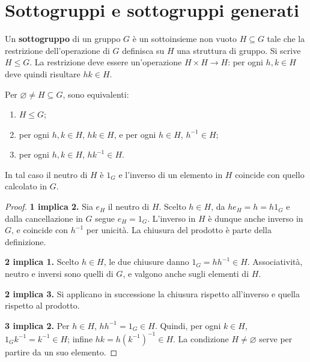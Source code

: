 \section{Sottogruppi e sottogruppi generati}
\begin{definizione}
Un \textbf{sottogruppo} di un gruppo $G$ è un sottoinsieme non vuoto $H\subseteq G$ tale che la restrizione dell'operazione di $G$ definisca su $H$ una struttura di gruppo. Si scrive $H\le G$. La restrizione deve essere un'operazione $H\times H\to H$: per ogni $h,k\in H$ deve quindi risultare $hk\in H$.
\end{definizione}

\begin{proposizione}\label{prop:criterio-sottogruppo}
Per $\varnothing\ne H\subseteq G$, sono equivalenti:
\begin{enumerate}
\item $H\le G$;
\item per ogni $h,k\in H$, $hk\in H$, e per ogni $h\in H$, $h^{-1}\in H$;
\item per ogni $h,k\in H$, $hk^{-1}\in H$.
\end{enumerate}
In tal caso il neutro di $H$ è $1_G$ e l'inverso di un elemento in $H$ coincide con quello calcolato in $G$.
\end{proposizione}
\begin{proof}
\textbf{1 implica 2.} Sia $e_H$ il neutro di $H$. Scelto $h\in H$, da $he_H=h=h1_G$ e dalla cancellazione in $G$ segue $e_H=1_G$. L'inverso in $H$ è dunque anche inverso in $G$, e coincide con $h^{-1}$ per unicità. La chiusura del prodotto è parte della definizione.

\textbf{2 implica 1.} Scelto $h\in H$, le due chiusure danno $1_G=hh^{-1}\in H$. Associatività, neutro e inversi sono quelli di $G$, e valgono anche sugli elementi di $H$.

\textbf{2 implica 3.} Si applicano in successione la chiusura rispetto all'inverso e quella rispetto al prodotto.

\textbf{3 implica 2.} Per $h\in H$, $hh^{-1}=1_G\in H$. Quindi, per ogni $k\in H$, $1_Gk^{-1}=k^{-1}\in H$; infine $hk=h(k^{-1})^{-1}\in H$. La condizione $H\ne\varnothing$ serve per partire da un suo elemento.
\end{proof}


